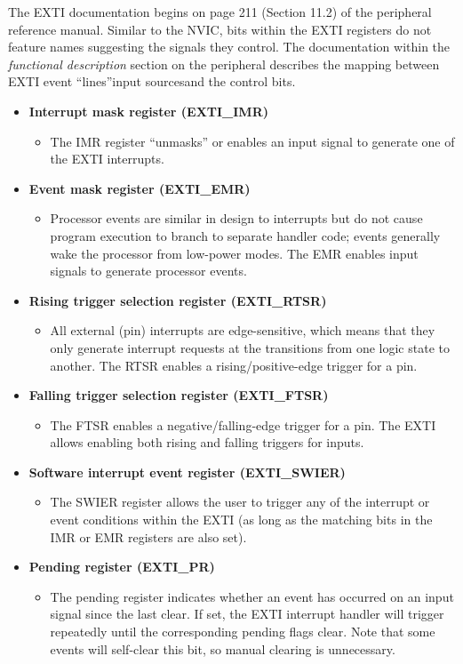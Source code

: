 \documentclass[openany,11pt,fleqn]{book} %
\begin{document}
The EXTI documentation begins on page 211 (Section 11.2) of the peripheral reference manual. Similar to the NVIC, bits within the EXTI registers do not feature names suggesting the signals they control. The documentation within the \textit{functional description} section on the peripheral describes the mapping between EXTI event ``lines''\textemdash input sources\textemdash and the control bits. 


\begin{itemize}
    \item \textbf{Interrupt mask register (EXTI\_IMR)}
    \begin{itemize}
        \item The IMR register ``unmasks'' or enables an input signal to generate one of the EXTI interrupts.
    \end{itemize}
    \item \textbf{Event mask register (EXTI\_EMR)}
    \begin{itemize}
        \item Processor events are similar in design to interrupts but do not cause program execution to branch to separate handler code; events generally wake the processor from low-power modes. The EMR enables input signals to generate processor events. 
    \end{itemize}
    \item \textbf{Rising trigger selection register (EXTI\_RTSR)}
    \begin{itemize}
        \item All external (pin) interrupts are edge-sensitive, which means that they only generate interrupt requests at the transitions from one logic state to another. The RTSR enables a rising/positive-edge trigger for a pin.
    \end{itemize}
    \item \textbf{Falling trigger selection register (EXTI\_FTSR)}
    \begin{itemize}
        \item The FTSR enables a negative/falling-edge trigger for a pin. The EXTI allows enabling both rising and falling triggers for inputs.  
    \end{itemize}
    \item \textbf{Software interrupt event register (EXTI\_SWIER)}
    \begin{itemize}
        \item The SWIER register allows the user to trigger any of the interrupt or event conditions within the EXTI (as long as the matching bits in the IMR or EMR registers are also set). 
    \end{itemize}
    \item \textbf{Pending register (EXTI\_PR)}
    \begin{itemize}
        \item  The pending register indicates whether an event has occurred on an input signal since the last clear. If set, the EXTI interrupt handler will trigger repeatedly until the corresponding pending flags clear. Note that some events will self-clear this bit, so manual clearing is unnecessary. 
    \end{itemize}
\end{itemize}
\end{document}
